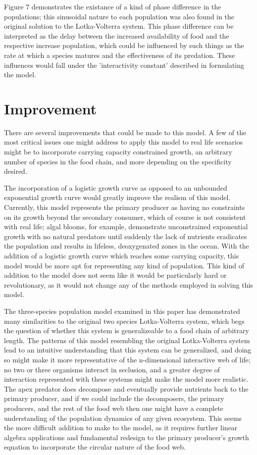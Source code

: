 \documentclass[11pt,oneside]{article}
\begin{document}
	Figure 7 demonstrates the existance of a kind of phase difference in the populations; this sinusoidal nature to each population was also found in the original solution to the Lotka-Volterra system. This phase difference can be interpreted as the delay between the increased availability of food and the respective increase population, which could be influenced by such things as the rate at which a species matures and the effectiveness of its predation. These influences would fall under the 'interactivity constant' described in formulating the model.
	
	
	\section{Improvement}
	There are several improvements that could be made to this model. A few of the most critical issues one might address to apply this model to real life scenarios might be to incorporate carrying capacity constrained growth, an arbitrary number of species in the food chain, and more depending on the specificity desired.
	
	The incorporation of a logistic growth curve as opposed to an unbounded exponential growth curve would greatly improve the realism of this model. Currently, this model represents the primary producer as having no constraints on its growth beyond the secondary consumer, which of course is not consistent with real life; algal blooms, for example, demonstrate unconstrained exponential growth with no natural predators until suddenly the lack of nutrients eradicates the population and results in lifeless, deoxygenated zones in the ocean. With the addition of a logistic growth curve which reaches some carrying capacity, this model would be more apt for representing any kind of population. This kind of addition to the model does not seem like it would be particularly hard or revolutionary, as it would not change any of the methods employed in solving this model.
	
	The three-species population model examined in this paper has demonstrated many similarities to the original two species Lotka-Volterra system, which begs the question of whether this system is generalizeable to a food chain of arbitrary length. The patterns of this model resembling the original Lotka-Volterra system lead to an intuitive understanding that this system can be generalized, and doing so might make it more representative of the n-dimensional interactive web of life; no two or three organisms interact in seclusion, and a greater degree of interaction represented with these systems might make the model more realistic. The apex predator does decompose and eventually provide nutrients back to the primary producer, and if we could include the decomposers, the primary producers, and the rest of the food web then one might have a complete understanding of the population dynamics of any given ecosystem. This seems the more difficult addition to make to the model, as it requires further linear algebra applications and fundamental redesign to the primary producer's growth equation to incorporate the circular nature of the food web.
	
\end{document}
